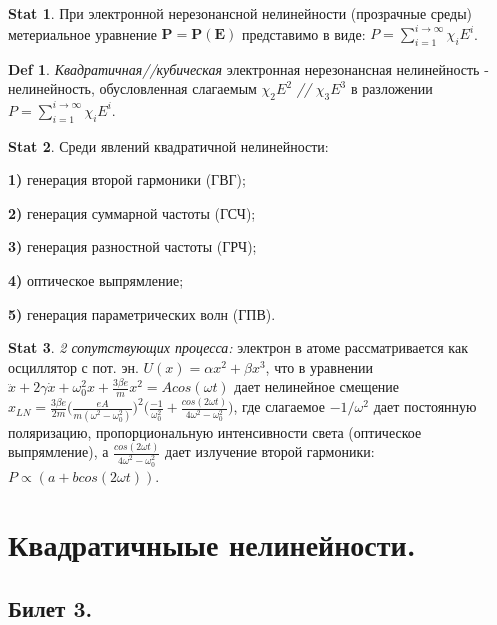 \documentclass[a4paper,12pt]{article}
\theoremstyle{definition} %
\newtheorem{Stat}{Stat}[section]
\theoremstyle{definition} %
\newtheorem{Def}{Def}[section]
\theoremstyle{remark} %
\begin{document}
\begin{Stat}\label{stat \theStat}
	При электронной нерезонансной нелинейности (прозрачные среды) метериальное уравнение $\mathbf{P}=\mathbf{P}(\mathbf{E})$ представимо в виде: $P=\sum\limits_{i=1}^{i \to \infty} \chi_{i} E^{i}$.
\end{Stat}
\begin{Def}\label{def \theDef}
	\textit{Квадратичная//кубическая} электронная нерезонансная нелинейность - нелинейность, обусловленная слагаемым $\chi_{2} E^{2}$ \textit{//} $\chi_{3} E^{3}$ в разложении $P=\sum\limits_{i=1}^{i \to \infty} \chi_{i} E^{i}$.
\end{Def}
\begin{Stat}\label{stat \theStat}
	Среди явлений квадратичной нелинейности: \\
	\par \textbf{1)} генерация второй гармоники (ГВГ); \\
	\par \textbf{2)} генерация суммарной частоты (ГСЧ); \\
	\par \textbf{3)} генерация разностной частоты (ГРЧ); \\
	\par \textbf{4)} оптическое выпрямление; \\
	\par \textbf{5)} генерация параметрических волн (ГПВ).
\end{Stat}
\begin{Stat}\label{stat \theStat}
	\textit{2 сопутствующих процесса:} электрон в атоме рассматривается как осциллятор с пот. эн. $U(x)=\alpha x^{2} + \beta x^{3}$, что в уравнении $\ddot{x} + 2\gamma \dot{x} + \omega_{0}^{2} x + \frac{3\beta e}{m} x^{2} = Acos(\omega t)$ дает нелинейное смещение $x_{LN} = \frac{3\beta e}{2m} \Big( \frac{eA}{m(\omega^{2}-\omega_{0}^{2})} \Big)^{2} \Big( \frac{-1}{\omega_{0}^{2}} + \frac{cos(2\omega t)}{4\omega^{2}-\omega_{0}^{2}} \Big)$, где слагаемое $-1/\omega^{2}$ дает постоянную поляризацию, пропорциональную интенсивности света (оптическое выпрямление), а $\frac{cos(2\omega t)}{4\omega^{2}-\omega_{0}^{2}}$ дает излучение второй гармоники: \\ $P \propto (a+bcos(2\omega t))$.
\end{Stat}

\section{Квадратичныые нелинейности.}
\subsection{Билет 3.}
\end{document}
